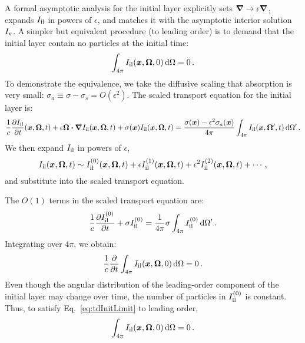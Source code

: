 A formal asymptotic analysis for the initial layer explicitly sets
$\bm{\nabla}\to\epsilon\bm{\nabla}$, expands $I_\mathrm{il}$ in powers of $\epsilon$, and matches it
with the asymptotic interior solution $I_\mathrm{v}$. A simpler but equivalent procedure
(to leading order) is to demand that the initial layer contain no particles
at the initial time:
\begin{equation*}
  \int_{4\pi} I_\mathrm{il}(\bm{x}, \bm{\Omega}, 0) \mathop{}\!\mathrm{d} \Omega = 0\,.
\end{equation*}
To demonstrate the equivalence, we take the diffusive scaling that absorption is
very small: $\sigma_a \equiv \sigma - \sigma_s = O(\epsilon^2)$. The scaled
transport equation for the initial layer is:
\begin{equation*}
  \frac{1}{c}\frac{\partial I_\mathrm{il}}{\partial t}(\bm{x},\bm{\Omega},t)
  + \epsilon \bm{\Omega}\bm{\cdot} \bm{\nabla} I_\mathrm{il}(\bm{x},\bm{\Omega},t)
  + \sigma(\bm{x}) I_\mathrm{il}(\bm{x},\bm{\Omega},t)
  = \frac{\sigma(\bm{x}) - \epsilon^2 \sigma_a(\bm{x})}{4\pi}
  \int_{4\pi} I_\mathrm{il}(\bm{x},\bm{\Omega}',t) \mathop{}\!\mathrm{d} \Omega' \,.
\end{equation*}
We then expand $I_\mathrm{il}$ in powers of $\epsilon$,
\begin{equation*}
  I_\mathrm{il}(\bm{x},\bm{\Omega},t) \sim I_\mathrm{il}^{(0)}(\bm{x},\bm{\Omega},t)
  + \epsilon I_\mathrm{il}^{(1)}(\bm{x},\bm{\Omega},t)
  + \epsilon^2 I_\mathrm{il}^{(2)}(\bm{x},\bm{\Omega},t)
  + \cdots\,,
\end{equation*}
and substitute into the scaled transport equation.

The $O(1)$ terms in the scaled transport equation are:
\begin{equation*}
  \frac{1}{c} \frac{\partial I_\mathrm{il}^{(0)}}{\partial t} + \sigma I_\mathrm{il}^{(0)} = \frac{1}{4\pi} \sigma
  \int_{4\pi} I_\mathrm{il}^{(0)} \mathop{}\!\mathrm{d} \Omega' \,.
\end{equation*}
Integrating over $4\pi$, we obtain:
\begin{equation*}
  \frac{1}{c} \frac{\partial }{\partial t}  \int_{4\pi} I_\mathrm{il}(\bm{x}, \bm{\Omega}, 0) \mathop{}\!\mathrm{d} \Omega
  = 0\,.
\end{equation*}
Even though the angular distribution of the leading-order component of the
initial layer may change over time, the number of particles in $I_\mathrm{il}^{(0)}$ is
constant. Thus, to satisfy Eq.~\eqref{eq:tdInitLimit} to leading order,
\begin{equation*}
  \int_{4\pi} I_\mathrm{il}(\bm{x}, \bm{\Omega}, 0) \mathop{}\!\mathrm{d} \Omega = 0\,.
\end{equation*}

